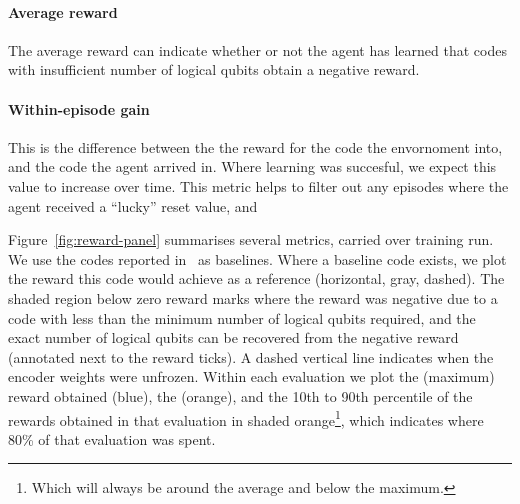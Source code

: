 \paragraph{Average reward} The average reward can indicate whether or not the agent has learned that codes with insufficient number of logical qubits obtain a negative reward.
\paragraph{Within-episode gain} This is the difference between the the reward for the code the envornoment  into, and the  code the agent arrived in. Where learning was succesful, we expect this value to increase over time. 
This metric helps to filter out any episodes where the agent received a ``lucky'' reset value, and 

\noindent Figure~\ref{fig:reward-panel} summarises several metrics, carried over  training run. We use the codes reported in~\cite{bravyi2024high} as 
baselines. Where a baseline code exists, we plot the reward this code would achieve as a reference (horizontal, gray, dashed). The shaded region below zero reward marks where the reward was negative due to a code with less than the minimum number of logical qubits required, 
and the exact number of logical qubits can be recovered from the negative reward (annotated next to the reward ticks). A dashed vertical line indicates when the encoder weights were unfrozen. Within each evaluation we plot the  (maximum) reward obtained (blue), the  (orange), 
and the 10th to 90th percentile of the rewards obtained in that evaluation in shaded orange\footnote{Which will always be around the average and below the maximum.}, which indicates where 80\% of that evaluation was spent.

